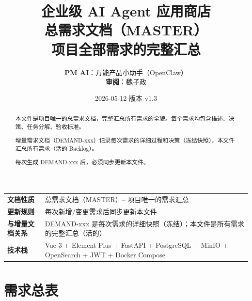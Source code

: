 \documentclass[11pt,a4paper]{article}
\title{
\vspace{-1em}
{\Huge\bfseries\color{primary} 企业级 AI Agent 应用商店}\\[0.8em]
{\Large\bfseries\color{accent} 总需求文档（MASTER）}\\[0.5em]
{\large 项目全部需求的完整汇总}
}
\author{
\textbf{PM AI}：万能产品小助手（OpenClaw）\\[0.3em]
\textbf{审阅}：魏子政
}
\date{2026-05-12 \quad 版本 v1.3}
\begin{document}
\maketitle
\thispagestyle{empty}

\begin{center}
\begin{tabular}{>{\bfseries}p{3cm} p{10cm}}
\toprule
文档性质 & 总需求文档（MASTER）-- 项目唯一的需求汇总 \\
更新规则 & 每次新增/变更需求后同步更新本文件 \\
与增量文档关系 & DEMAND-xxx 是每次需求的详细快照（冻结）；本文件是所有需求的完整汇总（活的） \\
技术栈 & Vue 3 + Element Plus + FastAPI + PostgreSQL + MinIO + OpenSearch + JWT + Docker Compose \\
\bottomrule
\end{tabular}
\end{center}

\vspace{1em}

\begin{abstract}
本文件是项目唯一的总需求文档，完整汇总所有需求的全貌。每个需求均包含描述、决策、任务分解、验收标准。

增量需求文档（DEMAND-xxx）记录每次需求的详细过程和决策（冻结快照），本文件汇总所有需求（活的 Backlog）。

每次生成 DEMAND-xxx 后，必须同步更新本文件。
\end{abstract}

\newpage
\tableofcontents
\newpage

\section{需求总表}
\end{document}
